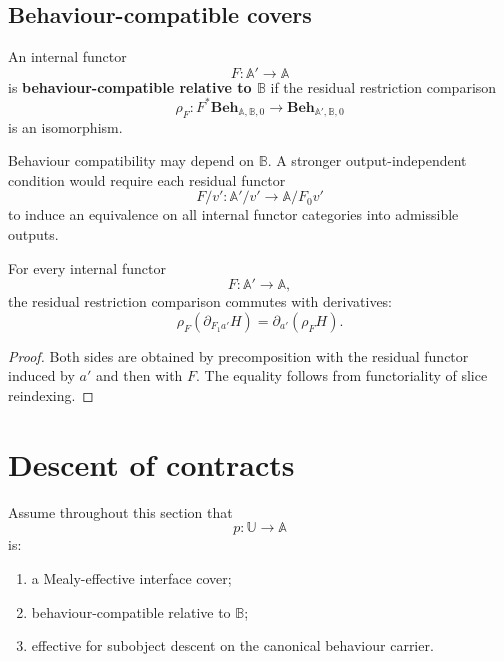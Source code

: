 \subsection{Behaviour-compatible covers}
\label{subsec:behaviour-compatible-covers}

\begin{definition}
\label{def:behaviour-compatible-input-functor}
An internal functor
\[
    F:\mathbb A'\to\mathbb A
\]
is \textbf{behaviour-compatible relative to \(\mathbb B\)} if the residual
restriction comparison
\[
    \rho_F:
    F^\ast
    \mathbf{Beh}_{\mathbb A,\mathbb B,0}
    \to
    \mathbf{Beh}_{\mathbb A',\mathbb B,0}
\]
is an isomorphism.
\end{definition}

\begin{remark}
\label{rem:relative-behaviour-compatibility}
Behaviour compatibility may depend on \(\mathbb B\). A stronger
output-independent condition would require each residual functor
\[
    F/v':
    \mathbb A'/v'
    \to
    \mathbb A/F_0v'
\]
to induce an equivalence on all internal functor categories into admissible
outputs.
\end{remark}

\begin{proposition}
\label{prop:residual-restriction-derivative-compatibility}
For every internal functor
\[
    F:\mathbb A'\to\mathbb A,
\]
the residual restriction comparison commutes with derivatives:
\[
    \rho_F\left(
    \partial_{F_1a'}H
    \right)
    =
    \partial_{a'}\left(\rho_FH\right).
\]
\end{proposition}

\begin{proof}
Both sides are obtained by precomposition with the residual functor induced by
\(a'\) and then with \(F\). The equality follows from functoriality of slice
reindexing.
\end{proof}

\section{Descent of contracts}
\label{sec:descent-contracts}

Assume throughout this section that
\[
    p:\mathbb U\to\mathbb A
\]
is:
\begin{enumerate}
    \item a Mealy-effective interface cover;
    \item behaviour-compatible relative to \(\mathbb B\);
    \item effective for subobject descent on the canonical behaviour carrier.
\end{enumerate}

